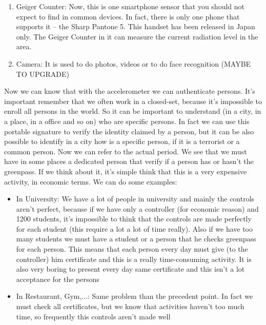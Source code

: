 \documentclass[12pt]{article}
\begin{document}
\begin{enumerate}
\item Geiger Counter: Now, this is one smartphone sensor that you should not expect to find in common devices. In fact, there is only one phone that supports it – the Sharp Pantone 5. This handset has been released in Japan only. The Geiger Counter in it can measure the current radiation level in the area.

\item Camera: It is used to do photos, videos or to do face recognition (MAYBE TO UPGRADE)

\end{enumerate}

Now we can know that with the accelerometer we can authenticate persons. It's important remember that we often work in a closed-set, because it's impossible to enroll all persons in the world. So it can be important to understand (in a city, in a place, in a office and so on) who are specific persons. In fact we can use this portable signature to verify the identity claimed by a person, but it can be also possible to identify in a city how is a specific person, if it is a terrorist or a common person.
Now we can refer to the actual period. We see that we must have in some places a dedicated person that verify if a person has or hasn't the greenpass. If we think about it, it's simple think that this is a very expensive activity, in economic terms. We can do some examples:

\begin{itemize}

\item In University: We have a lot of people in university and mainly the controls aren't perfect, because if we have only a controller (for economic reason) and 1200 students, it's impossible to think that the controls are made perfectly for each student (this require a lot a lot of time really). Also if we have too many students we must have a student or a person that he checks greenpass for each person. This means that each person every day must give (to the controller) him certificate and this is a really time-consuming activity. It is also very boring to present every day same certificate and this isn't a lot acceptance for the persons

\item In Restaurant, Gym,...: Same problem than the precedent point. In fact we must check all certificates, but we know that activities haven't too much time, so frequently this controls aren't made well

\end{itemize}
\end{document}
